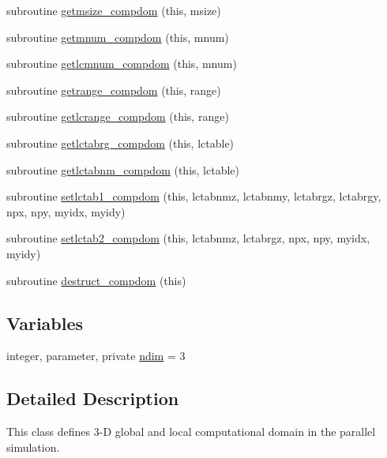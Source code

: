 \begin{DoxyCompactItemize}
subroutine \mbox{\hyperlink{namespacecompdomclass_a460a22916802ee9041aa66d1922cb812}{getmsize\+\_\+compdom}} (this, msize)
\item 
subroutine \mbox{\hyperlink{namespacecompdomclass_a4742fe5698151e1e31e2261798a433c8}{getmnum\+\_\+compdom}} (this, mnum)
\item 
subroutine \mbox{\hyperlink{namespacecompdomclass_a545b0a4e8dce9ec9c326806ed1b36598}{getlcmnum\+\_\+compdom}} (this, mnum)
\item 
subroutine \mbox{\hyperlink{namespacecompdomclass_acba710aa1017492e05a537273742cc16}{getrange\+\_\+compdom}} (this, range)
\item 
subroutine \mbox{\hyperlink{namespacecompdomclass_ad0a907860c5bf17c263d8ad957c7ed1d}{getlcrange\+\_\+compdom}} (this, range)
\item 
subroutine \mbox{\hyperlink{namespacecompdomclass_ab679e7ac8218e1580f1a45a53d1fe9f1}{getlctabrg\+\_\+compdom}} (this, lctable)
\item 
subroutine \mbox{\hyperlink{namespacecompdomclass_a7c7c1450a459bb1753ef8230ab0d7651}{getlctabnm\+\_\+compdom}} (this, lctable)
\item 
subroutine \mbox{\hyperlink{namespacecompdomclass_a60f5ad087b624e541fe9c0872e1c4b90}{setlctab1\+\_\+compdom}} (this, lctabnmz, lctabnmy, lctabrgz, lctabrgy, npx, npy, myidx, myidy)
\item 
subroutine \mbox{\hyperlink{namespacecompdomclass_a4bc32865e40fe6b277898a429caff3ca}{setlctab2\+\_\+compdom}} (this, lctabnmz, lctabrgz, npx, npy, myidx, myidy)
\item 
subroutine \mbox{\hyperlink{namespacecompdomclass_ae220a1544909bd8851faed61ce9ad7b8}{destruct\+\_\+compdom}} (this)
\end{DoxyCompactItemize}
\subsection*{Variables}
\begin{DoxyCompactItemize}
\item 
integer, parameter, private \mbox{\hyperlink{namespacecompdomclass_a01f031d8af670f66db4484cd6411e99f}{ndim}} = 3
\end{DoxyCompactItemize}


\subsection{Detailed Description}
This class defines 3-\/D global and local computational domain in the parallel simulation. 

